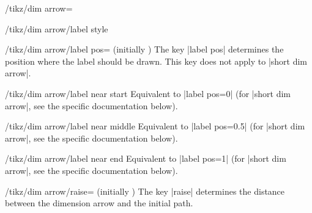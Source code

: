 \documentclass[a4paper]{ltxdoc}
\begin{document}
\begin{stylekey}{/tikz/dim arrow=}
\begin{stylekey}{/tikz/dim arrow/label style}
\begin{codeexample}[]
\end{codeexample}
  \end{stylekey}

  \begin{key}{/tikz/dim arrow/label pos= (initially )}
  The key |label pos| determines the position  where the label should be drawn.
  This key does not apply to |short dim arrow|.

\begin{codeexample}[]
\end{codeexample}
  \end{key}

  \begin{key}{/tikz/dim arrow/label near start}
  Equivalent to |label pos=0| (for |short dim arrow|, see the specific documentation below).
  \end{key}

  \begin{key}{/tikz/dim arrow/label near middle}
  Equivalent to |label pos=0.5| (for |short dim arrow|, see the specific documentation below).
  \end{key}

  \begin{key}{/tikz/dim arrow/label near end}
  Equivalent to |label pos=1| (for |short dim arrow|, see the specific documentation below).
  \end{key}

  \begin{key}{/tikz/dim arrow/raise= (initially )}
  The key |raise| determines the distance  between the dimension arrow and the initial path.
  \begin{codeexample}[]
\end{codeexample}
\end{key}
\end{stylekey}
\end{document}
